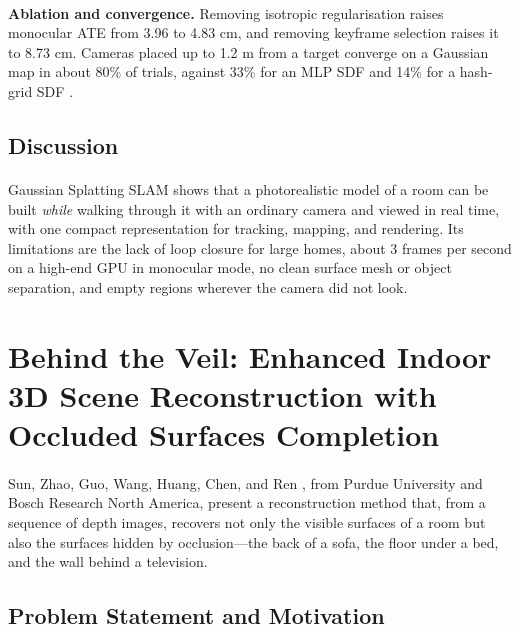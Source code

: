 \documentclass[12pt,a4paper,final]{extreport}
\begin{document}
\paragraph{} \textbf{Ablation and convergence.} Removing isotropic regularisation raises monocular ATE from 3.96 to 4.83 cm, and removing keyframe selection raises it to 8.73 cm. Cameras placed up to 1.2 m from a target converge on a Gaussian map in about 80\% of trials, against 33\% for an MLP SDF and 14\% for a hash-grid SDF \cite{p3}.

\subsection{Discussion}

\paragraph{} Gaussian Splatting SLAM shows that a photorealistic model of a room can be built \emph{while} walking through it with an ordinary camera and viewed in real time, with one compact representation for tracking, mapping, and rendering. Its limitations are the lack of loop closure for large homes, about 3 frames per second on a high-end GPU in monocular mode, no clean surface mesh or object separation, and empty regions wherever the camera did not look.

\section{Behind the Veil: Enhanced Indoor 3D Scene Reconstruction with Occluded Surfaces Completion}

\paragraph{} Sun, Zhao, Guo, Wang, Huang, Chen, and Ren \cite{p4}, from Purdue University and Bosch Research North America, present a reconstruction method that, from a sequence of depth images, recovers not only the visible surfaces of a room but also the surfaces hidden by occlusion---the back of a sofa, the floor under a bed, and the wall behind a television.

\subsection{Problem Statement and Motivation}
\end{document}
